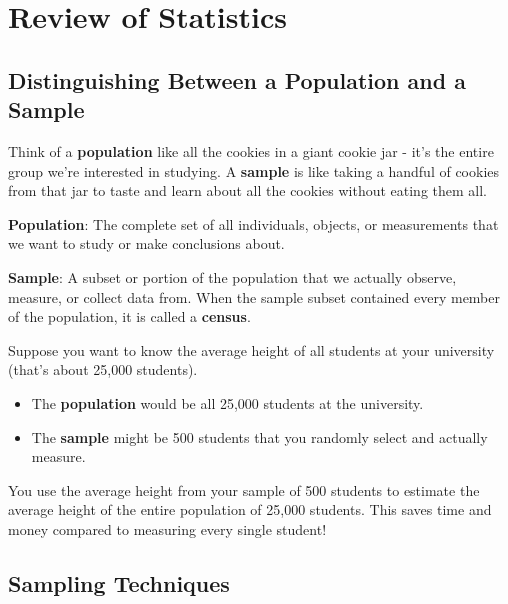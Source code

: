 \chapter{Review of Statistics}

\section{Distinguishing Between a Population and a Sample}

Think of a \textbf{population} like all the cookies in a giant cookie jar - it's the entire group we're interested in studying. A \textbf{sample} is like taking a handful of cookies from that jar to taste and learn about all the cookies without eating them all.

\textbf{Population}: The complete set of all individuals, objects, or measurements that we want to study or make conclusions about.

\textbf{Sample}: A subset or portion of the population that we actually observe, measure, or collect data from.
When the sample subset contained every member of the population, it is called a \textbf{census}.

\begin{example}
Suppose you want to know the average height of all students at your university (that's about 25,000 students). 
\begin{itemize}
    \item[{\color{blue!55!white} \ding{104}}] The \textbf{population} would be all 25,000 students at the university.
    \item[{\color{blue!55!white} \ding{104}}] The \textbf{sample} might be 500 students that you randomly select and actually measure.
\end{itemize}
You use the average height from your sample of 500 students to estimate the average height of the entire population of 25,000 students. This saves time and money compared to measuring every single student!
\end{example}


\section{Sampling Techniques}

